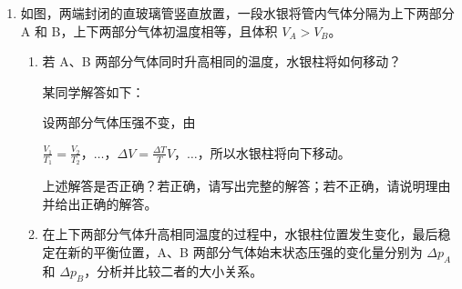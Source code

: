 \documentclass[\gkver]{gaokaozhenti}
\begin{document}
\begin{enumerate}
{(3) 由 $\frac{V}{T}=\frac{\Delta V}{\Delta T}=\frac{k}{p}$，大气压强略有升高后，比值变小，升高相同的温度，气体体积变化小，示数偏低。
}

\item
如图，两端封闭的直玻璃管竖直放置，一段水银将管内气体分隔为上下两部分 A 和 B，上下两部分气体初温度相等，且体积 $V_{A} > V_{B}$。
\begin{enumerate}
	\item
	若 A、B 两部分气体同时升高相同的温度，水银柱将如何移动？

	某同学解答如下：

	设两部分气体压强不变，由

	$\frac{V_{1}}{T_{1}}=\frac{V_{2}}{T_{2}}$，$\ldots$，$\Delta V=\frac{\Delta T}{T}V$，$\ldots$，所以水银柱将向下移动。

	上述解答是否正确？若正确，请写出完整的解答；若不正确，请说明理由并给出正确的解答。
	\item
	在上下两部分气体升高相同温度的过程中，水银柱位置发生变化，最后稳定在新的平衡位置，A、B 两部分气体始末状态压强的变化量分别为 $\Delta p_{A}$ 和 $\Delta p_{B}$，分析并比较二者的大小关系。
\end{enumerate}
\onepicture[align=right, w=0.66cm]{}
\end{enumerate}
\end{document}

